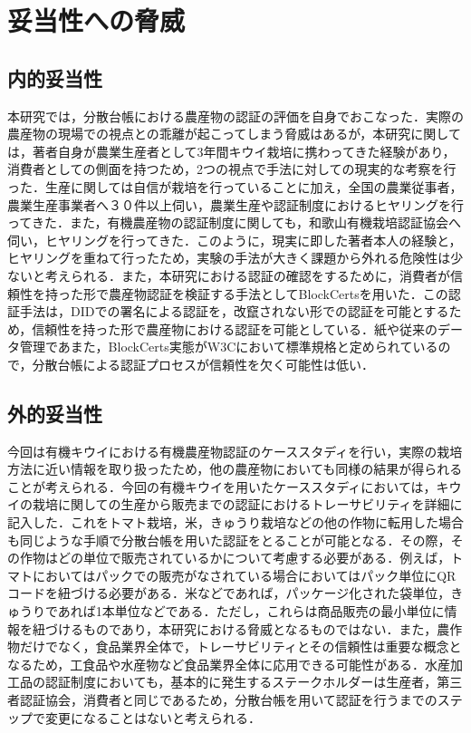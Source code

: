 \documentclass[11pt,dvipdfmx]{jreport}
\begin{document}
\chapter{妥当性への脅威}

\section{内的妥当性}
本研究では，分散台帳における農産物の認証の評価を自身でおこなった．実際の農産物の現場での視点との乖離が起こってしまう脅威はあるが，本研究に関しては，著者自身が農業生産者として3年間キウイ栽培に携わってきた経験があり，消費者としての側面を持つため，2つの視点で手法に対しての現実的な考察を行った．生産に関しては自信が栽培を行っていることに加え，全国の農業従事者，農業生産事業者へ３０件以上伺い，農業生産や認証制度におけるヒヤリングを行ってきた．また，有機農産物の認証制度に関しても，和歌山有機栽培認証協会へ伺い，ヒヤリングを行ってきた．このように，現実に即した著者本人の経験と，ヒヤリングを重ねて行ったため，実験の手法が大きく課題から外れる危険性は少ないと考えられる．また，本研究における認証の確認をするために，消費者が信頼性を持った形で農産物認証を検証する手法としてBlockCertsを用いた．この認証手法は，DIDでの署名による認証を，改竄されない形での認証を可能とするため，信頼性を持った形で農産物における認証を可能としている．紙や従来のデータ管理であまた，BlockCerts実態がW3Cにおいて標準規格と定められているので，分散台帳による認証プロセスが信頼性を欠く可能性は低い．

\section{外的妥当性}
今回は有機キウイにおける有機農産物認証のケーススタディを行い，実際の栽培方法に近い情報を取り扱ったため，他の農産物においても同様の結果が得られることが考えられる．今回の有機キウイを用いたケーススタディにおいては，キウイの栽培に関しての生産から販売までの認証におけるトレーサビリティを詳細に記入した．これをトマト栽培，米，きゅうり栽培などの他の作物に転用した場合も同じような手順で分散台帳を用いた認証をとることが可能となる．その際，その作物はどの単位で販売されているかについて考慮する必要がある．例えば，トマトにおいてはパックでの販売がなされている場合においてはパック単位にQRコードを紐づける必要がある．米などであれば，パッケージ化された袋単位，きゅうりであれば1本単位などである．ただし，これらは商品販売の最小単位に情報を紐づけるものであり，本研究における脅威となるものではない．また，農作物だけでなく，食品業界全体で，トレーサビリティとその信頼性は重要な概念となるため，工食品や水産物など食品業界全体に応用できる可能性がある．水産加工品の認証制度においても，基本的に発生するステークホルダーは生産者，第三者認証協会，消費者と同じであるため，分散台帳を用いて認証を行うまでのステップで変更になることはないと考えられる．
\end{document}
